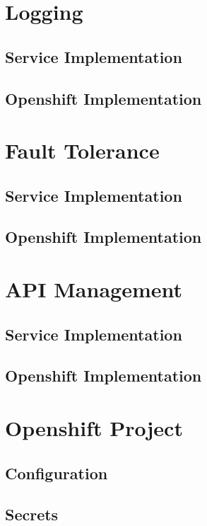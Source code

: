 \section{Logging}
\label{sec:esbi-logging}

\subsection{Service Implementation}
\label{sec:esbi-logging-service}

\subsection{Openshift Implementation}
\label{sec:esbi-logging-openshift}

\section{Fault Tolerance}
\label{sec:esbi-fault}

\subsection{Service Implementation}
\label{sec:esbi-fault-service}

\subsection{Openshift Implementation}
\label{sec:esbi-fault-openshift}

\section{API Management}
\label{sec:esbi-api}

\subsection{Service Implementation}
\label{sec:esbi-api-service}

\subsection{Openshift Implementation}
\label{sec:esbi-api-openshift}

\section{Openshift Project}
\label{sec:esbi-openshift}

\subsection{Configuration}
\label{sec:esbi-openshift-config}

\subsection{Secrets}
\label{sec:esbi-openshift-secrets}

